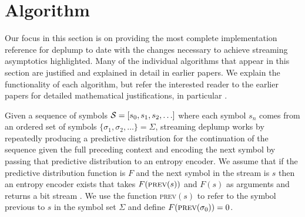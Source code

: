 \section{Algorithm}
%
%

Our focus in this section is on providing the most complete implementation reference for deplump to date with the changes necessary to achieve streaming asymptotics highlighted.  Many of the individual algorithms that appear in this section are justified and explained in detail in earlier papers.  We explain the functionality of each algorithm, but refer the interested reader to the earlier papers for detailed mathematical justifications, in particular \citep{Wood2009,Gasthaus2010,Bartlett2010}.

Given a sequence of symbols $\Seq = [s_0, s_1, s_2, \ldots]$ where each symbol $s_n$ comes from an ordered set of symbols $\{\sigma_1, \sigma_2, \ldots\} = \Sigma$,  streaming deplump works by repeatedly producing a predictive distribution for the continuation of the sequence given the full preceding context and encoding the next symbol by passing that predictive distribution to an entropy encoder. %
We assume that if the predictive distribution function is $F$ and the next symbol in the stream is $s$ then %
an entropy encoder exists that takes $F(\textsc{prev}(s))$ and $F(s)$ as arguments and returns a bit stream \citep{Witten1987}. %
We use the function \textsc{prev}$(s)$ to refer to the symbol previous to $s$ in the symbol set $\Sigma$ and define $F(\textsc{prev}(\sigma_0)) = 0$.  %

